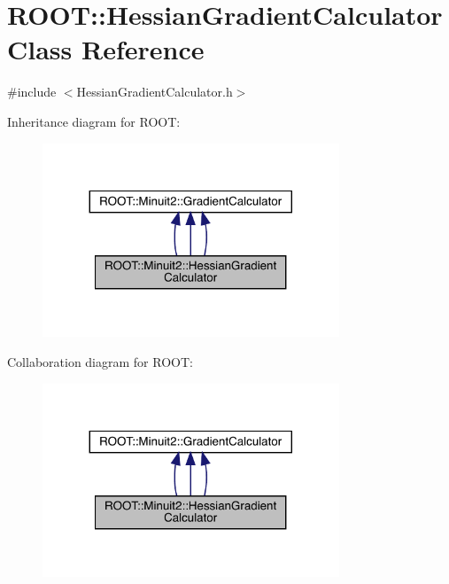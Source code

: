 \hypertarget{classROOT_1_1Minuit2_1_1HessianGradientCalculator}{}\section{R\+O\+OT\+:\+:Hessian\+Gradient\+Calculator Class Reference}
\label{classROOT_1_1Minuit2_1_1HessianGradientCalculator}


{\ttfamily \#include $<$Hessian\+Gradient\+Calculator.\+h$>$}



Inheritance diagram for R\+O\+OT\+:
\nopagebreak
\begin{figure}[H]
\begin{center}
\leavevmode
\includegraphics[width=251pt]{d2/dbb/classROOT_1_1Minuit2_1_1HessianGradientCalculator__inherit__graph}
\end{center}
\end{figure}


Collaboration diagram for R\+O\+OT\+:
\nopagebreak
\begin{figure}[H]
\begin{center}
\leavevmode
\includegraphics[width=251pt]{db/d76/classROOT_1_1Minuit2_1_1HessianGradientCalculator__coll__graph}
\end{center}
\end{figure}
